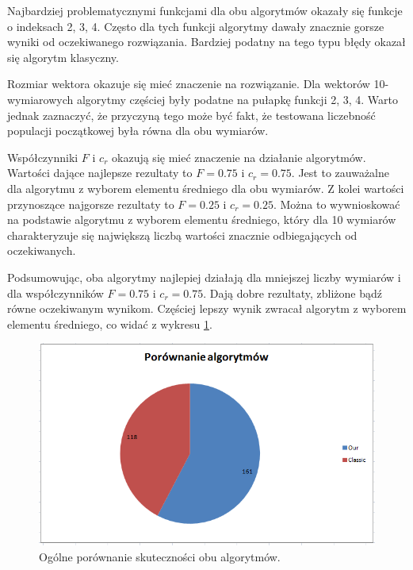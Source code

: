 \documentclass[a4paper]{article}
\begin{document}
Najbardziej problematycznymi funkcjami dla obu algorytmów okazały się funkcje o indeksach 2, 3, 4. Często dla tych funkcji algorytmy dawały znacznie gorsze wyniki od oczekiwanego rozwiązania. Bardziej podatny na tego typu błędy okazał się algorytm klasyczny. 

Rozmiar wektora okazuje się mieć znaczenie na rozwiązanie. Dla wektorów 10-wymiarowych algorytmy częściej były podatne na pułapkę funkcji 2, 3, 4. Warto jednak zaznaczyć, że przyczyną tego może być fakt, że testowana liczebność populacji początkowej była równa dla obu wymiarów. 

Współczynniki $F$ i $c_r$ okazują się mieć znaczenie na działanie algorytmów. Wartości dające najlepsze rezultaty to $F=0.75$ i $c_r=0.75$. Jest to zauważalne dla algorytmu z wyborem elementu średniego dla obu wymiarów. Z kolei wartości przynoszące najgorsze rezultaty to $F=0.25$ i $c_r=0.25$. Można to wywnioskować na podstawie algorytmu z wyborem elementu średniego, który dla 10 wymiarów charakteryzuje się największą liczbą wartości znacznie odbiegających od oczekiwanych.

Podsumowując, oba algorytmy najlepiej działają dla mniejszej liczby wymiarów i dla współczynników $F=0.75$ i $c_r=0.75$. Dają dobre rezultaty, zbliżone bądź równe oczekiwanym wynikom. Częściej lepszy wynik zwracał algorytm z wyborem elementu średniego, co widać z wykresu \ref{rys:statystyka}.

\begin{figure}[!h]
\centering
\includegraphics[width=\textwidth]{statystyka.png}
\caption{Ogólne porównanie skuteczności obu algorytmów.}
\label{rys:statystyka}
\end{figure}
\end{document}
